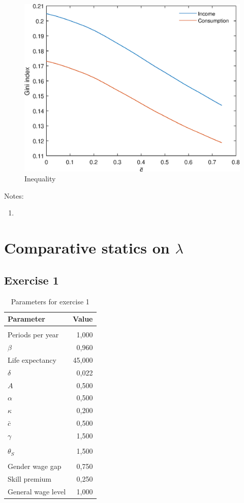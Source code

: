 \documentclass[12pt]{article}
\begin{document}
\begin{figure}
	\centering
	\caption{Inequality}
	\includegraphics{Graphs/ineq_cbar_ex1.eps}
\end{figure}

Notes:

\begin{enumerate}
	\item 
\end{enumerate}

\clearpage

\section{Comparative statics on $\lambda$}

\subsection{Exercise 1}

\begin{table}[htbp]
	\centering
	\caption{Parameters for exercise 1}
	\begin{tabular}{lr}
		\toprule
		Parameter & \multicolumn{1}{l}{Value} \\
		\midrule
		&  \\
		Periods per year & 1,000 \\
		$\beta$ & 0,960 \\
		Life expectancy & 45,000 \\
		$\delta$ & 0,022 \\
		$A$ & 0,500 \\
		$\alpha$ & 0,500 \\
		$\kappa$ & 0,200 \\
		$\bar {c}$ & 0,500 \\
		$\gamma$ & 1,500 \\
		&  \\
		$\theta_S$ & 1,500 \\
		&  \\
		Gender wage gap & 0,750 \\
		Skill premium & 0,250 \\
		General wage level & 1,000 \\
		\bottomrule
	\end{tabular}
\end{table}
\end{document}
